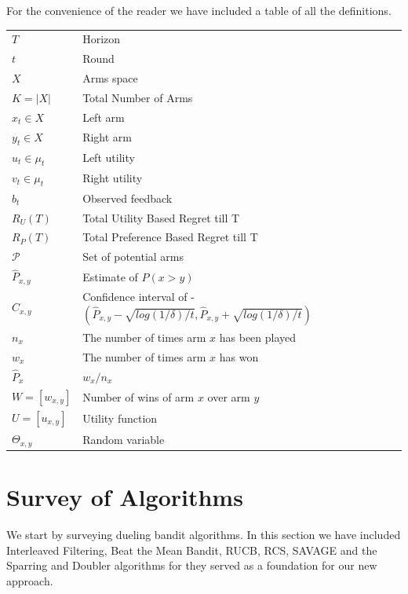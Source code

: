 \documentclass{llncs}
\begin{document}
For the convenience of the reader we have included a table of all the definitions. 
	\begin{table}[h]
		\begin{tabular}{ll}
 			$T$ & Horizon \\
 			$t$ &  Round \\
 			$X$ & Arms space \\
 			$K = |X|$ & Total Number of Arms\\
 			$x_t \in X$ & Left arm \\
 			$y_t \in X$ & Right arm \\
 			$u_t \in \mu_t$ & Left utility \\
 			$v_t \in \mu_t$ & Right utility \\
 			$b_t$ & Observed feedback \\
 			$R_U(T)$ & Total Utility Based Regret till T\\
			$R_P(T)$ & Total Preference Based Regret till T\\
 			$\mathcal{P}$ & Set of potential arms \\
 			$\hat{P}_{x, y}$ & Estimate of $P(x>y)$\\
 			$\hat{C}_{x, y}$ &   Confidence interval of - $(\hat{P}_{x, y} - \sqrt{log(1/\delta)/t},\hat{P}_{x, y} +\sqrt{log(1/\delta)/t})$\\
 			$n_x$ &   The number of times arm $x$ has been played\\
 			$w_x$ & The number of times arm $x$ has won\\
 			$\hat{P}_x  $ &  $ w_x / n_x $\\
 			$ W = [w_{x,y}]$ & Number of wins of arm $x$ over arm $y$\\
 			$U = [u_{x,y}]$ &  Utility function\\
 			$\Theta_{x,y}$ &   Random variable
		\end{tabular}
	\end{table}

\newpage

\section{Survey of Algorithms }
	We start by surveying dueling bandit algorithms. In this section we have included Interleaved Filtering, Beat the Mean Bandit, RUCB, RCS, SAVAGE and the Sparring and Doubler algorithms for they served as a foundation for our new approach.
	
\end{document}
